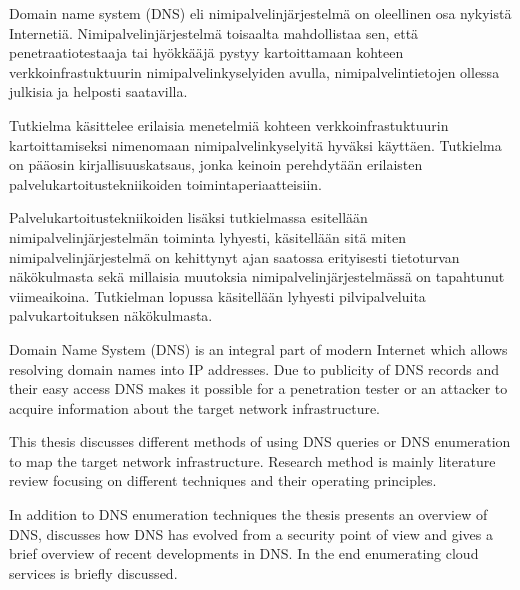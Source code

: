 %
%

\begin{fiabstract}
Domain name system (DNS) eli nimipalvelinjärjestelmä on oleellinen osa nykyistä Internetiä. Nimipalvelinjärjestelmä toisaalta mahdollistaa sen, että penetraatiotestaaja tai hyökkääjä pystyy kartoittamaan kohteen verkkoinfrastuktuurin nimipalvelinkyselyiden avulla, nimipalvelintietojen ollessa julkisia ja helposti saatavilla. 

Tutkielma käsittelee erilaisia menetelmiä kohteen verkkoinfrastuktuurin kartoittamiseksi nimenomaan nimipalvelinkyselyitä hyväksi käyttäen. Tutkielma on pääosin kirjallisuuskatsaus, jonka keinoin perehdytään erilaisten palvelukartoitustekniikoiden toimintaperiaatteisiin.

Palvelukartoitustekniikoiden lisäksi tutkielmassa esitellään nimipalvelinjärjestelmän toiminta lyhyesti, käsitellään sitä miten nimipalvelinjärjestelmä on kehittynyt ajan saatossa erityisesti tietoturvan näkökulmasta sekä millaisia muutoksia nimipalvelinjärjestelmässä on tapahtunut viimeaikoina. Tutkielman lopussa käsitellään lyhyesti pilvipalveluita palvukartoituksen näkökulmasta.

%
\end{fiabstract}


\begin{enabstract}
Domain Name System (DNS) is an integral part of modern Internet which allows resolving domain names into IP addresses. Due to publicity of DNS records and their easy access DNS makes it possible for a penetration tester or an attacker to acquire information about the target network infrastructure.

This thesis discusses different methods of using DNS queries or DNS enumeration to map the target network infrastructure. Research method is mainly literature review focusing on different techniques and their operating principles. 

In addition to DNS enumeration techniques the thesis presents an overview of DNS, discusses how DNS has evolved from a security point of view and gives a brief overview of recent developments in DNS. In the end enumerating cloud services is briefly discussed.
\end{enabstract}
